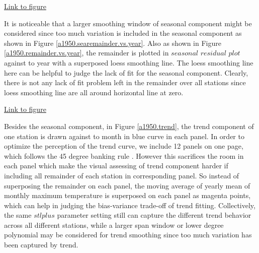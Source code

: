 \begin{framed}
\begin{center}
  \href{../plots/a1950/stlplus/t231td2_s21sd1_ffd/a1950.searemainder.vs.year.pdf}
  {Link to figure}
  \label{a1950.searemainder.vs.year}
\end{center}
\end{framed}

It is noticeable that a larger smoothing window of seasonal component might be 
considered since too much variation is included in the seasonal component as
shown in Figure 
\href{../plots/a1950/stlplus/t231td2_s21sd1_ffd/a1950.searemainder.vs.year.pdf}
{\ref*{a1950.searemainder.vs.year}}. 
Also as shown in Figure
\href{../plots/a1950/stlplus/t231td2_s21sd1_ffd/a1950.remainder.vs.year.pdf}
{\ref*{a1950.remainder.vs.year}}, the remainder is plotted in $seasonal$ 
$residual$ $plot$ \cite{hafen2010local} against to year with a superposed loess 
smoothing line. The loess smoothing line here can be helpful to judge the lack
of fit for the seasonal component. Clearly, there is not any lack of fit problem
left in the remainder over all stations since loess smoothing line are all around
horizontal line at zero.

\begin{framed}
\begin{center}
  \href{../plots/a1950/stlplus/t231td2_s21sd1_ffd/a1950.remainder.vs.year.pdf}
  {Link to figure}
  \label{a1950.remainder.vs.year}
\end{center}
\end{framed}


Besides the seasonal component, in Figure \href{../plots/a1950/stlplus/t231td2_s21sd1_ffd/a1950.trend.vs.time.pdf}
{\ref*{a1950.trend}}, the trend component of one station is drawn against to 
month in blue curve in each panel. In order to optimize the perception of the 
trend curve, we include 12 panels on one page, which follows the 45 degree banking
rule \cite{clevelandvisualizing}. However this sacrifices the room in each panel
which make the visual assessing of trend component harder if including all 
remainder of each station in corresponding panel. So instead of superposing the
remainder on each panel, the moving average of yearly mean of monthly 
maximum temperature is superposed on each panel as magenta points, which can 
help in judging the bias-variance trade-off of trend fitting.
Collectively, the same $stlplus$ parameter setting still can capture the different
trend behavior across all different stations, while a larger span window or lower
degree polynomial may be considered for trend smoothing since too much variation
has been captured by trend.

